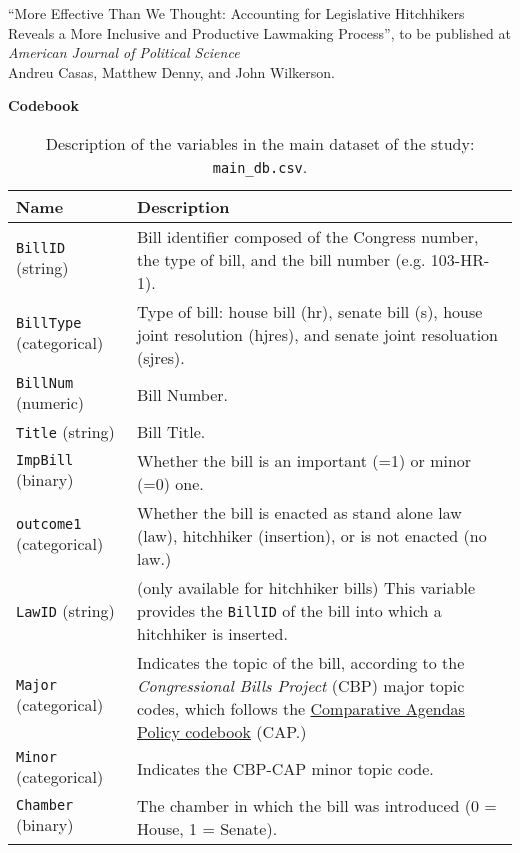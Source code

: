 \documentclass[10pt,a4paper]{article}
\begin{document}
\noindent ``More Effective Than We Thought: Accounting for Legislative Hitchhikers Reveals a More Inclusive and Productive Lawmaking Process'', to be published at \textit{American Journal of Political Science} \\
\noindent Andreu Casas, Matthew Denny, and John Wilkerson. \\

\begin{center}
\LARGE \textbf{Codebook} \\
\end{center}

\begin{table}[!h]
\caption{Description of the variables in the main dataset of the study: \texttt{main\_db.csv}.}
\hspace*{-0.75cm}\begin{tabular}{lL{12cm}}
\textbf{Name} & \textbf{Description} \\
\hline
{}
\texttt{BillID}	(string) &  Bill identifier composed of the Congress number, the type of bill, and the bill number (e.g. 103-HR-1). \\
\texttt{BillType} (categorical) & Type of bill: house bill (hr), senate bill (s), house joint resolution (hjres), and senate joint resoluation (sjres). \\
\texttt{BillNum}	(numeric) & Bill Number. \\
\texttt{Title}	(string) & Bill Title. \\
\texttt{ImpBill} (binary) & Whether the bill is an important (=1) or minor (=0) one. \\
\texttt{outcome1}	(categorical) & Whether the bill is enacted as stand alone law (law), hitchhiker (insertion), or is not enacted (no law.) \\
\texttt{LawID} (string) &(only available for hitchhiker bills) This variable provides the \texttt{BillID} of the bill into which a hitchhiker is inserted. \\
\texttt{Major} (categorical) & Indicates the topic of the bill, according to the \textit{Congressional Bills Project} (CBP) major topic codes, which follows the \href{https://www.comparativeagendas.net/pages/master-codebook}{Comparative Agendas Policy codebook} (CAP.) \\
\texttt{Minor}	 (categorical) & Indicates the CBP-CAP minor topic code. \\
\texttt{Chamber} (binary)& The chamber in which the bill was introduced (0 = House, 1 = Senate). \\

\end{tabular}
\end{table}
\end{document}
